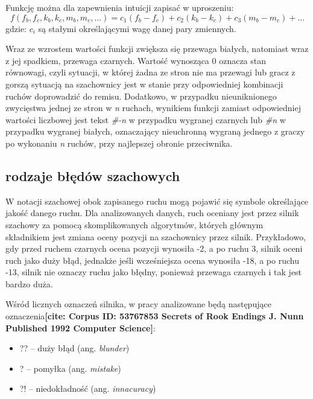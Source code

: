 \documentclass[inzynierska]{pwr_wmat_praca_dyplomowa}
\theoremstyle{plain}
\numberwithin{theorem}{chapter}
\theoremstyle{definition}
\numberwithin{theorem}{chapter}
\begin{document}
Funkcję można dla zapewnienia intuicji zapisać w uproszeniu:
\begin{equation}
	f(f_b,f_c,k_b,k_c,m_b,m_c,\dots)=c_1(f_b-f_c)+c_2(k_b-k_c)+c_3(m_b-m_c)+\dots
\end{equation}
gdzie:
$c_i$ są stałymi określającymi wagę danej pary zmiennych.

Wraz ze wzrostem wartości funkcji zwiększa się przewaga białych, natomiast wraz z jej spadkiem, przewaga czarnych. Wartość wynosząca 0 oznacza stan równowagi, czyli sytuacji, w której żadna ze stron nie ma przewagi lub gracz z gorszą sytuacją na szachownicy jest w stanie przy odpowiedniej kombinacji ruchów doprowadzić do remisu. Dodatkowo, w przypadku nieuniknionego zwycięstwa jednej ze stron w \textit{n} ruchach, wynikiem funkcji zamiast odpowiedniej wartości liczbowej jest tekst \textit{\#-n} w przypadku wygranej czarnych lub \textit{\#n} w przypadku wygranej białych, oznaczający nieuchronną wygraną jednego z graczy po wykonaniu \textit{n} ruchów, przy najlepszej obronie przeciwnika.


\subsection{rodzaje błędów szachowych} \label{sec:mysection}


W notacji szachowej obok zapisanego ruchu mogą pojawić się symbole określające jakość danego ruchu. Dla analizowanych danych, ruch oceniany jest przez silnik szachowy za pomocą skomplikowanych algorytmów, których głównym składnikiem jest zmiana oceny pozycji na szachownicy przez silnik.
Przykładowo, gdy przed ruchem czarnych ocena pozycji wynosiła -2, a po ruchu 3, silnik oceni ruch jako duży błąd, jednakże jeśli wcześniejsza ocena wynosiła -18, a po ruchu -13, silnik nie oznaczy ruchu jako błędny, ponieważ przewaga czarnych i tak jest bardzo duża.

Wśród licznych oznaczeń silnika, w pracy analizowane będą następujące oznaczenia\textbf{[cite: Corpus ID: 53767853 Secrets of Rook Endings J. Nunn Published 1992 Computer Science]}:
\begin{itemize}
	\item ??\hphantom{!} -- duży błąd (ang. \textit{blunder})
	\item ?\hphantom{?!}  -- pomyłka (ang. \textit{mistake})
	\item ?!\hphantom{?} -- niedokładność  (ang. \textit{innacuracy})
\end{itemize}
\end{document}
